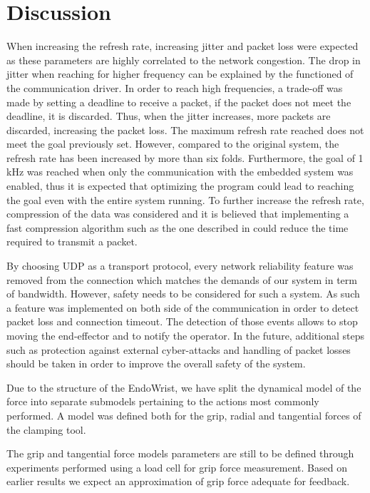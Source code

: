 \section{Discussion}

When increasing the refresh rate, increasing jitter and packet loss were expected as these parameters are highly correlated to the network congestion\cite{cisco_jitter}. The drop in jitter when reaching for higher frequency can be explained by the functioned of the communication driver. In order to reach high frequencies, a trade-off was made by setting a deadline to receive a packet, if the packet does not meet the deadline, it is discarded. Thus, when the jitter increases, more packets are discarded, increasing the packet loss.
The maximum refresh rate reached does not meet the goal previously set. However, compared to the original system, the refresh rate has been increased by more than six folds. Furthermore, the goal of 1 kHz was reached when only the communication with the embedded system was enabled, thus it is expected that optimizing the program could lead to reaching the goal even with the entire system running.
To further increase the refresh rate, compression of the data was considered and it is believed that implementing a fast compression algorithm such as the one described in \cite{fast_ZIV} could reduce the time required to transmit a packet.

{\color{purple}By choosing UDP as a transport protocol, every network reliability feature was removed from the connection which matches the demands of our system in term of bandwidth. 
However, safety needs to be considered for such a system. 
As such a feature was implemented on both side of the communication in order to detect packet loss and connection timeout. 
The detection of those events allows to stop moving the end-effector and to notify the operator. 
In the future, additional steps such as protection against external cyber-attacks and handling of packet losses should be taken in order to improve the overall safety of the system.
}

Due to the structure of the EndoWrist, we have split the dynamical model of the force into separate submodels pertaining to the actions most commonly performed.
A model was defined both for the grip, radial and tangential forces of the clamping tool.

The grip and tangential force models parameters are still to be defined through experiments performed using a load cell for grip force measurement.
Based on earlier results \cite{kim2014dynamic} we expect an approximation of grip force adequate for feedback.

